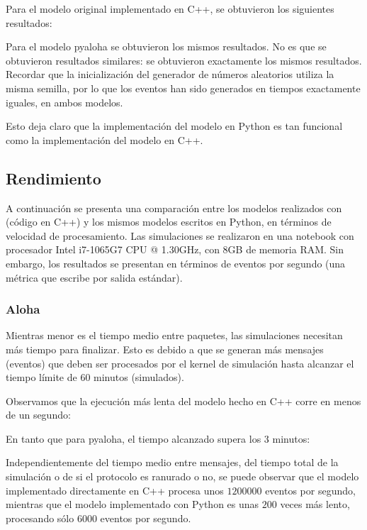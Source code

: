 \documentclass[]{article}
\begin{document}
Para el modelo original implementado en C++, se obtuvieron los siguientes
resultados:


Para el modelo pyaloha se obtuvieron los mismos resultados. No es que se
obtuvieron resultados similares: se obtuvieron exactamente los mismos
resultados. Recordar que la inicialización del generador de números aleatorios
utiliza la misma semilla, por lo que los eventos han sido generados en tiempos
exactamente iguales, en ambos modelos.

Esto deja claro que la implementación del modelo en Python es tan funcional
como la implementación del modelo en C++.

\subsection{Rendimiento}

A continuación se presenta una comparación entre los modelos realizados con
\omnetpp{} (código en C++) y los mismos modelos escritos en Python, en términos de
velocidad de procesamiento. Las simulaciones se realizaron en una notebook con
procesador Intel i7-1065G7 CPU @ 1.30GHz, con 8GB de memoria RAM. Sin embargo,
los resultados se presentan en términos de eventos por segundo (una métrica que
\omnetpp{} escribe por salida estándar).

\subsubsection{Aloha}

Mientras menor es el tiempo medio entre paquetes, las simulaciones necesitan
más tiempo para finalizar. Esto es debido a que se generan más mensajes
(eventos) que deben ser procesados por el kernel de simulación hasta alcanzar
el tiempo límite de 60 minutos (simulados).

Observamos que la ejecución más lenta del modelo hecho en C++ corre en menos de
un segundo:


En tanto que para pyaloha, el tiempo alcanzado supera los 3 minutos:


Independientemente del tiempo medio entre mensajes, del tiempo total de la
simulación o de si el protocolo es ranurado o no, se puede observar que el
modelo implementado directamente en C++ procesa unos $1200000$ eventos por
segundo, mientras que el modelo implementado con Python es unas $200$ veces más
lento, procesando sólo $6000$ eventos por segundo.
\end{document}
